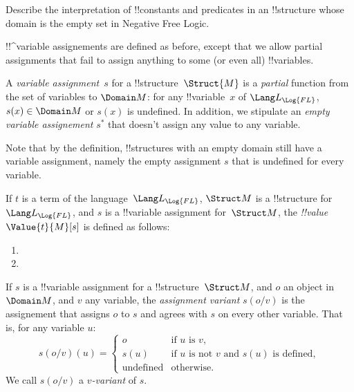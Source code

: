 \documentclass[../../../include/open-logic-section]{subfiles}
\begin{document}
\begin{prob}
Describe the interpretation of !!{constant}s and predicates in 
an !!{structure} whose domain is the empty set in Negative Free Logic.
\end{prob}

!!^{variable} assignements are defined as before, except that we allow
partial assignments that fail to assign anything to some (or even all)
!!{variable}s. 

\begin{defn}
A \emph{variable assignment}~$s$ for a !!{structure}~$\Struct{M}$ is a
\emph{partial} function from the set of variables to
$\Domain M$: for any !!{variable}~$x$ of
$\Lang L_{\Log{FL}}$, $s(x) \in \Domain M$ or $s(x)$ is undefined. 
In addition, we stipulate
an \emph{empty variable assignement} $s^{*}$ that doesn't assign any value to
any variable.
\end{defn}

Note that by the definition, !!{structure}s with an empty domain still
have a variable assignment, namely the empty assignment $s$ that is 
undefined for every variable. 

\begin{defn}
If $t$ is a term of the language~$\Lang L_{\Log{FL}}$, $\Struct M$ is a
!!{structure} for~$\Lang L_{\Log{FL}}$, and $s$ is a !!{variable} assignment
for~$\Struct M$, the \emph{!!{value}}~$\Value{t}{M}[s]$ is defined as
follows:
\begin{enumerate}
\item {}
\item {}
\end{enumerate}
\end{defn}

\begin{defn}
If $s$ is a !!{variable} assignment for a !!{structure}~$\Struct M$,
and $o$ an object in $\Domain M$, and $v$ any variable, the
\emph{assignment variant} $s(o/v)$ is the assignement that assigns $o$
to $s$ and agrees with $s$ on every other variable. That is, for any
variable $u$:
$$
s(o/v)(u)=\begin{cases}
  o & \text{if $u$ is $v$},\\
  s(u) & \text{if $u$ is not $v$ and $s(u)$ is defined},\\
  \text{undefined} & \text{otherwise}.  
\end{cases}
$$
We call $s(o/v)$ a \emph{$v$-variant} of $s$.
\end{defn}
\end{document}
